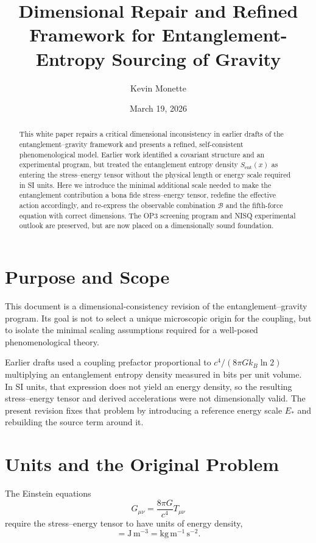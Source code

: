 \documentclass[11pt]{article}
\title{Dimensional Repair and Refined Framework for Entanglement-Entropy Sourcing of Gravity}
\author{Kevin Monette}
\date{March 19, 2026}
\begin{document}
\maketitle

\begin{abstract}
This white paper repairs a critical dimensional inconsistency in earlier drafts of the entanglement--gravity framework and presents a refined, self-consistent phenomenological model. Earlier work identified a covariant structure and an experimental program, but treated the entanglement entropy density $S_{\mathrm{ent}}(x)$ as entering the stress--energy tensor without the physical length or energy scale required in SI units. Here we introduce the minimal additional scale needed to make the entanglement contribution a bona fide stress--energy tensor, redefine the effective action accordingly, and re-express the observable combination $\mathcal{B}$ and the fifth-force equation with correct dimensions. The OP3 screening program and NISQ experimental outlook are preserved, but are now placed on a dimensionally sound foundation.
\end{abstract}

\section{Purpose and Scope}

This document is a dimensional-consistency revision of the entanglement--gravity program. Its goal is not to select a unique microscopic origin for the coupling, but to isolate the minimal scaling assumptions required for a well-posed phenomenological theory.

Earlier drafts used a coupling prefactor proportional to $c^4/(8\pi G k_B \ln 2)$ multiplying an entanglement entropy density measured in bits per unit volume. In SI units, that expression does not yield an energy density, so the resulting stress--energy tensor and derived accelerations were not dimensionally valid. The present revision fixes that problem by introducing a reference energy scale $E_*$ and rebuilding the source term around it.

\section{Units and the Original Problem}

The Einstein equations
\begin{equation}
G_{\mu\nu} = \frac{8\pi G}{c^4} T_{\mu\nu}
\end{equation}
require the stress--energy tensor to have units of energy density,
\begin{equation}
[T_{\mu\nu}] = \mathrm{J\,m^{-3}} = \mathrm{kg\,m^{-1}\,s^{-2}}.
\end{equation}
\end{document}

